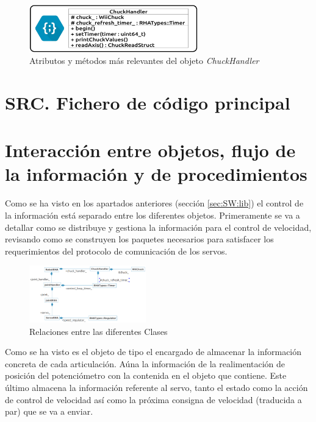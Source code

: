         \begin{figure}[H]
          	\centering
          	\includegraphics[width=0.65\textwidth]{figuras/Imagenes_SW/class_diagram_CHH.jpg}
          	\caption{Atributos y métodos más relevantes del objeto \textit{ChuckHandler}}
          	\label{fig:SW:class_diagram_CHH}
        \end{figure}

\section{SRC. Fichero de código principal} \label{sec:SW:src}

\section{Interacción entre objetos, flujo de la información y de procedimientos} \label{sec:SW:interacion_informacion_proced}

	Como se ha visto en los apartados anteriores (sección \ref{sec:SW:lib}) el control de la información está separado entre los diferentes objetos. Primeramente se va a detallar como se distribuye y gestiona la información para el control de velocidad, revisando como se construyen los paquetes necesarios para satisfacer los requerimientos del protocolo de comunicación de los servos.
	\\

	\begin{figure}[H]
		\centering
		\includegraphics[width=0.45\textwidth]{figuras/Imagenes_SW/class_relation.png}
		\caption{Relaciones entre las diferentes Clases }
		\label{fig:SW:class_relation}
	\end{figure}

	Como se ha visto es el objeto de tipo  el encargado de almacenar la información concreta de cada articulación. Aúna la información de la realimentación de posición del potenciómetro con la contenida en el objeto  que contiene. Este último almacena la información referente al servo, tanto el estado como la acción de control de velocidad así como la próxima consigna de velocidad (traducida a par) que se va a enviar.
	\\

